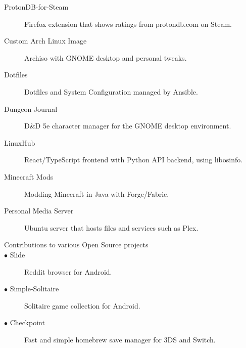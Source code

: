 \documentclass[letterpaper,11pt]{article}
\begin{document}
\begin{description}
\item[ProtonDB-for-Steam] Firefox extension that shows ratings from protondb.com on Steam.
\item[Custom Arch Linux Image] Archiso with GNOME desktop and personal tweaks.
\item[Dotfiles] Dotfiles and System Configuration managed by Ansible.
\item[Dungeon Journal] D\&D 5e character manager for the GNOME desktop environment.
\item[LinuxHub] React/TypeScript frontend with Python API backend, using libosinfo.
\item[Minecraft Mods] Modding Minecraft in Java with Forge/Fabric.
\item[Personal Media Server] Ubuntu server that hosts files and services such as Plex.
\break
\item[Contributions to various Open Source projects]
\item[\quad $\bullet$ Slide] Reddit browser for Android.
\item[\quad $\bullet$ Simple-Solitaire] Solitaire game collection for Android.
\item[\quad $\bullet$ Checkpoint] Fast and simple homebrew save manager for 3DS and Switch.
\end{description}
\end{document}
